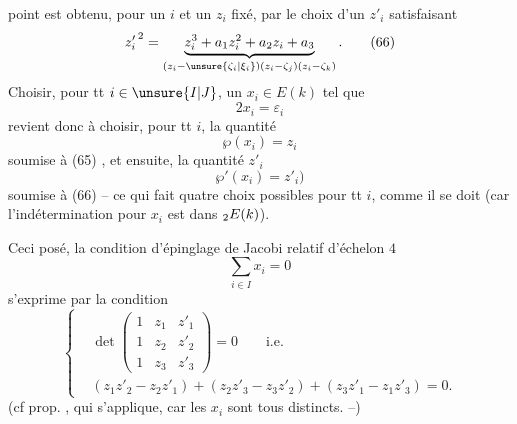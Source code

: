 point est obtenu, pour un $i$ et un $z_i$ fixé, par le choix d'un $z'_i$ satisfaisant
\[
 {z'_i}^{\,2}=\underbrace{z_i^3+a_1z_i^2+a_2z_i+a_3}_{(z_i-\unsure{\zeta_i|\xi_i})(z_i-\zeta_j)(z_i-\zeta_k)}. \tag*{(66)}
\]
Choisir, pour tt $i\in\unsure{I|J}$, un $x_i\in E(k)$ tel que
\[
 2x_i=\varepsilon_i \tag*{(67)}
\]
revient donc à choisir, pour tt $i$,  la quantité
\[
 \wp(x_i)=z_i \tag*{(68 a)}
\]
soumise à (65) , et ensuite, la quantité $z'_i$
\[
 \wp'(x_i)=z'_i) \tag*{(68 b)}
\]
soumise à (66) -- ce qui fait quatre choix possibles pour tt $i$, comme il se doit (car l'indétermination pour $x_i$ est dans $\vphantom{E}_2E(k)$).

Ceci posé, la condition d'épinglage de Jacobi relatif d'échelon $4$
\[
 \sum_{i\in I}x_i=0 \tag*{(69)}
\]
s'exprime par la condition
\[
 \left\{\begin{aligned}
 &\det\begin{pmatrix}1&z_1&z'_1\\1&z_2&z'_2\\1&z_3&z'_3\end{pmatrix}=0\qquad\text{i.e.}\\
 &(z_1z'_2-z_2z'_1)+(z_2z'_3-z_3z'_2)+(z_3z'_1-z_1z'_3)=0.
 \end{aligned}\right. \tag*{(70)}
\]
(cf prop. , qui s'applique, car les $x_i$ sont tous distincts. --)
